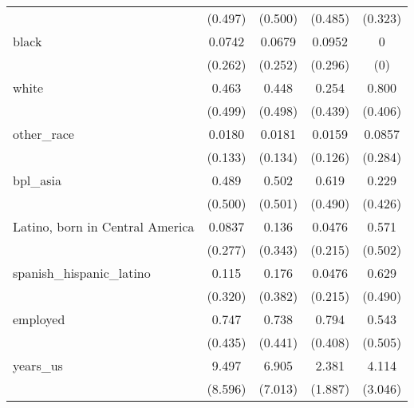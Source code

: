 \begin{table}[htbp]
\begin{tabular}{l*{4}{c}}
                    &     (0.497)         &     (0.500)         &     (0.485)         &     (0.323)         \\
[1em]
black               &      0.0742         &      0.0679         &      0.0952         &           0         \\
                    &     (0.262)         &     (0.252)         &     (0.296)         &         (0)         \\
[1em]
white               &       0.463         &       0.448         &       0.254         &       0.800         \\
                    &     (0.499)         &     (0.498)         &     (0.439)         &     (0.406)         \\
[1em]
other\_race          &      0.0180         &      0.0181         &      0.0159         &      0.0857         \\
                    &     (0.133)         &     (0.134)         &     (0.126)         &     (0.284)         \\
[1em]
bpl\_asia            &       0.489         &       0.502         &       0.619         &       0.229         \\
                    &     (0.500)         &     (0.501)         &     (0.490)         &     (0.426)         \\
[1em]
Latino, born in Central America&      0.0837         &       0.136         &      0.0476         &       0.571         \\
                    &     (0.277)         &     (0.343)         &     (0.215)         &     (0.502)         \\
[1em]
spanish\_hispanic\_latino&       0.115         &       0.176         &      0.0476         &       0.629         \\
                    &     (0.320)         &     (0.382)         &     (0.215)         &     (0.490)         \\
[1em]
employed            &       0.747         &       0.738         &       0.794         &       0.543         \\
                    &     (0.435)         &     (0.441)         &     (0.408)         &     (0.505)         \\
[1em]
years\_us            &       9.497         &       6.905         &       2.381         &       4.114         \\
                    &     (8.596)         &     (7.013)         &     (1.887)         &     (3.046)         \\

\end{tabular}
\end{table}
